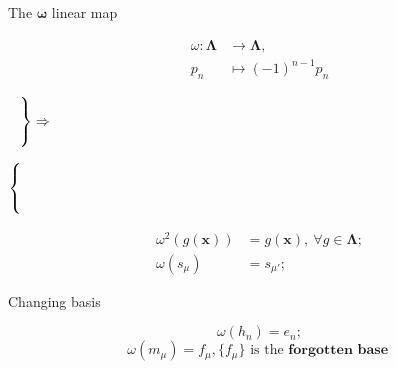 \documentclass[12pt]{amsart}
\begin{document}
\vspace{-10pt}\begin{mdframed}[linecolor=red!20, linewidth=3pt,innertopmargin=8pt]
	\begin{minipage}[t]{3.55cm}
		\begin{bf}The $\bm{\omega}$ linear map\end{bf}
		\begin{align*}\omega:\mathbf{\Lambda}&\rightarrow\mathbf{\Lambda},
		\\			p_n&\mapsto(-1)^{n-1}p_n 
		\end{align*}
	\end{minipage}
	\begin{minipage}[t]{1.2cm}
		\vspace{7pt}$\left.\begin{tikzpicture}
			\node(!) at (0,0){};
			\node(2) at (0,.5){};
		\end{tikzpicture} \right\}\Rightarrow$
	\end{minipage}
	\begin{minipage}[t]{.35cm}
		\vspace{7pt}$\left\{\begin{tikzpicture}
		\node(!) at (0,0){};
		\node(2) at (0,.5){};
		\end{tikzpicture} \right.$
	\end{minipage}
	\begin{minipage}[t]{5cm}
		\begin{align*}
			\omega^2(g(\bm{x}))&=g(\bm{x}),~ \forall g\in\mathbf{\Lambda};
			\\  \omega(s_\mu)&=s_{\mu'};
		\end{align*}
	\end{minipage}
	\begin{minipage}[t]{9cm}
		\begin{bf}Changing basis\end{bf}
		\begin{equation}  \omega(h_n)=e_n ;\end{equation}
		\begin{equation}\omega(m_\mu)=f_\mu, \{f_\mu\} \text{ is the }\textbf{forgotten base }
		\end{equation}
	\end{minipage}
\end{mdframed}
\end{document}
